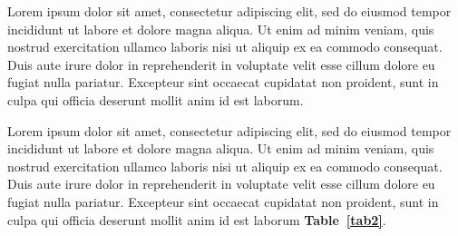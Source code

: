 Lorem ipsum dolor sit amet, consectetur adipiscing elit, sed do eiusmod tempor incididunt ut labore et dolore magna aliqua. Ut enim ad minim veniam, quis nostrud exercitation ullamco laboris nisi ut aliquip ex ea commodo consequat. Duis aute irure dolor in reprehenderit in voluptate velit esse cillum dolore eu fugiat nulla pariatur. Excepteur sint occaecat cupidatat non proident, sunt in culpa qui officia deserunt mollit anim id est laborum. 

Lorem ipsum dolor sit amet, consectetur adipiscing elit, sed do eiusmod tempor incididunt ut labore et dolore magna aliqua. Ut enim ad minim veniam, quis nostrud exercitation ullamco laboris nisi ut aliquip ex ea commodo consequat. Duis aute irure dolor in reprehenderit in voluptate velit esse cillum dolore eu fugiat nulla pariatur. Excepteur sint occaecat cupidatat non proident, sunt in culpa qui officia deserunt mollit anim id est laborum \textbf{Table~\ref{tab2}}.
